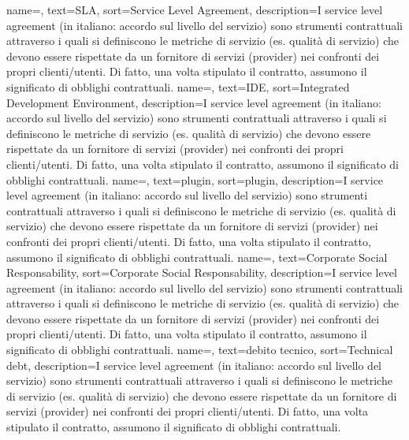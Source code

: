 {
	name=,
	text=SLA,
	sort=Service Level Agreement,
	description={I service level agreement (in italiano: accordo sul livello del servizio) sono strumenti contrattuali attraverso i quali si definiscono le metriche di servizio (es. qualità di servizio) che devono essere rispettate da un fornitore di servizi (provider) nei confronti dei propri clienti/utenti. Di fatto, una volta stipulato il contratto, assumono il significato di obblighi contrattuali.}
}
{
	name=,
	text=IDE,
	sort=Integrated Development Environment,
	description={I service level agreement (in italiano: accordo sul livello del servizio) sono strumenti contrattuali attraverso i quali si definiscono le metriche di servizio (es. qualità di servizio) che devono essere rispettate da un fornitore di servizi (provider) nei confronti dei propri clienti/utenti. Di fatto, una volta stipulato il contratto, assumono il significato di obblighi contrattuali.}
}
{
	name=,
	text=plugin,
	sort=plugin,
	description={I service level agreement (in italiano: accordo sul livello del servizio) sono strumenti contrattuali attraverso i quali si definiscono le metriche di servizio (es. qualità di servizio) che devono essere rispettate da un fornitore di servizi (provider) nei confronti dei propri clienti/utenti. Di fatto, una volta stipulato il contratto, assumono il significato di obblighi contrattuali.}
}
{
	name=,
	text=Corporate Social Responsability,
	sort=Corporate Social Responsability,
	description={I service level agreement (in italiano: accordo sul livello del servizio) sono strumenti contrattuali attraverso i quali si definiscono le metriche di servizio (es. qualità di servizio) che devono essere rispettate da un fornitore di servizi (provider) nei confronti dei propri clienti/utenti. Di fatto, una volta stipulato il contratto, assumono il significato di obblighi contrattuali.}
}
{
	name=,
	text=debito tecnico,
	sort=Technical debt,
	description={I service level agreement (in italiano: accordo sul livello del servizio) sono strumenti contrattuali attraverso i quali si definiscono le metriche di servizio (es. qualità di servizio) che devono essere rispettate da un fornitore di servizi (provider) nei confronti dei propri clienti/utenti. Di fatto, una volta stipulato il contratto, assumono il significato di obblighi contrattuali.}
}